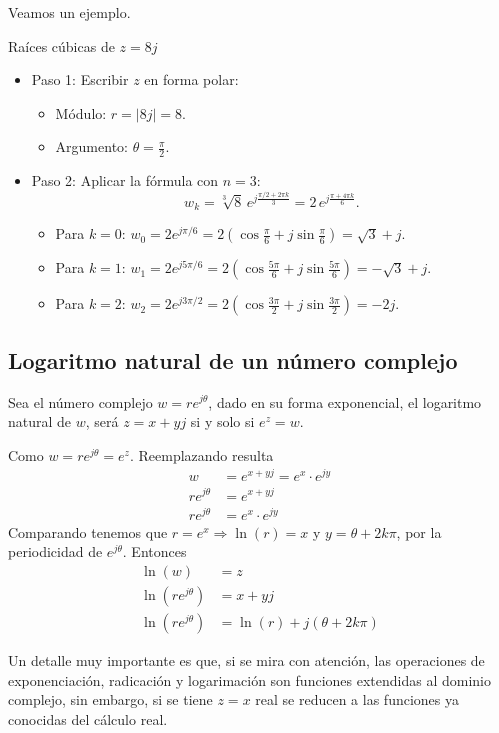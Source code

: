 Veamos un ejemplo.
\begin{example}
Raíces cúbicas de \( z = 8j \)
\begin{itemize}
  \item Paso 1: Escribir \( z \) en forma polar:
    \begin{itemize}
      \item Módulo: \( r = |8j| = 8 \).
      \item Argumento: \( \theta = \frac{\pi}{2} \).
    \end{itemize}
  \item Paso 2: Aplicar la fórmula con \( n = 3 \):
    \[
    w_k = \sqrt[3]{8} \, e^{j \frac{\pi/2 + 2\pi k}{3}} = 2 \, e^{j \frac{\pi + 4\pi k}{6}}.
    \]
    \begin{itemize}
      \item Para \( k = 0 \): \( w_0 = 2 e^{j\pi/6} = 2\left( \cos\frac{\pi}{6} + j\sin\frac{\pi}{6} \right) = \sqrt{3} + j \).
      \item Para \( k = 1 \): \( w_1 = 2 e^{j5\pi/6} = 2\left( \cos\frac{5\pi}{6} + j\sin\frac{5\pi}{6} \right) = -\sqrt{3} + j \).
      \item Para \( k = 2 \): \( w_2 = 2 e^{j3\pi/2} = 2\left( \cos\frac{3\pi}{2} + j\sin\frac{3\pi}{2} \right) = -2j \).
    \end{itemize}
\end{itemize}
\end{example}

\subsection{Logaritmo natural de un número complejo}

Sea el número complejo $w=re^{j\theta}$, dado en su forma exponencial, el logaritmo natural de $w$, será $z=x+yj$ si y solo si $e^z=w$.

Como $w=re^{j\theta} = e^z$. Reemplazando resulta
\begin{align*}
  w &= e^{x+yj}=e^x\cdot e^{jy} \\ 
  re^{j\theta} &= e^{x+yj} \\ 
  re^{j\theta} &=e^x\cdot e^{jy}
\end{align*}
Comparando tenemos que $r=e^{x}\Rightarrow \ln(r)=x$ y $y=\theta + 2k\pi$, por la periodicidad de $e^{j\theta}$. Entonces
\begin{align*}
  \ln(w)&=z \\ 
  \ln(re^{j\theta}) &= x+yj \\ 
  \ln(re^{j\theta}) &= \ln(r) + j(\theta + 2k\pi)
\end{align*}

Un detalle muy importante es que, si se mira con atención, las operaciones de exponenciación, radicación y logarimación son funciones extendidas al dominio complejo, sin embargo, si se tiene $z=x$ real se reducen a las funciones ya conocidas del cálculo real.

